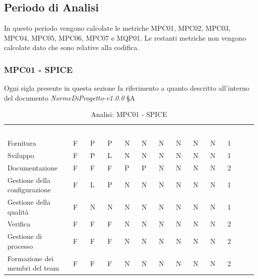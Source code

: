 \subsection{Periodo di Analisi}
In questo periodo vengono calcolate le metriche MPC01, MPC02, MPC03, MPC04, MPC05, MPC06, MPC07 e MQP01. Le restanti metriche non vengono calcolate dato che sono relative alla codifica.

\subsubsection{MPC01 - SPICE}
Ogni sigla presente in questa sezione fa riferimento a quanto descritto all'interno del documento \textit{NormeDiProgetto-v1.0.0} §A

\begin{table}[H]
        \renewcommand{\arraystretch}{1.5}
        \begin{tabular}{ m{}<{\centering}  m{}<{\centering} m{}<{\centering} m{}<{\centering} m{}<{\centering} m{}<{\centering} m{}<{\centering} m{}<{\centering} m{}<{\centering} m{}<{\centering} m{}<{\centering}}
	\rowcolor{darkblue}
	\textcolor{white}{\textbf{Processo}} &\textcolor{white}{\textbf{1.1}} &\textcolor{white}{\textbf{2.1}} &\textcolor{white}{\textbf{2.2}} &\textcolor{white}{\textbf{3.1}} &\textcolor{white}{\textbf{3.2}} &\textcolor{white}{\textbf{4.1}} &\textcolor{white}{\textbf{4.2}} &\textcolor{white}{\textbf{5.1}} &\textcolor{white}{\textbf{5.2}} &\textcolor{white}{\textbf{Livello}}\\ 
    
    
    Fornitura & F & P & P & N & N & N & N & N & N & 1 \\
    Sviluppo & F & P & L & N & N & N & N & N & N & 1 \\
    Documentazione & F & F & F & P & P & N & N & N & N & 2 \\
    Gestione della configurazione & F & L & P & N & N & N & N & N & N & 1 \\
    Gestione della qualità & F & N & N & N & N & N & N & N & N & 1 \\
    Verifica & F & F & F & N & N & N & N & N & N & 2 \\
   
    Gestione di processo & F & F & F & N & N & N & N & N & N & 2 \\
    Formazione dei membri del team & F & F & F & N & N & N & N & N & N & 2 \\
    
    \end{tabular}
\caption{Analisi: MPC01 - SPICE}
\end{table}

